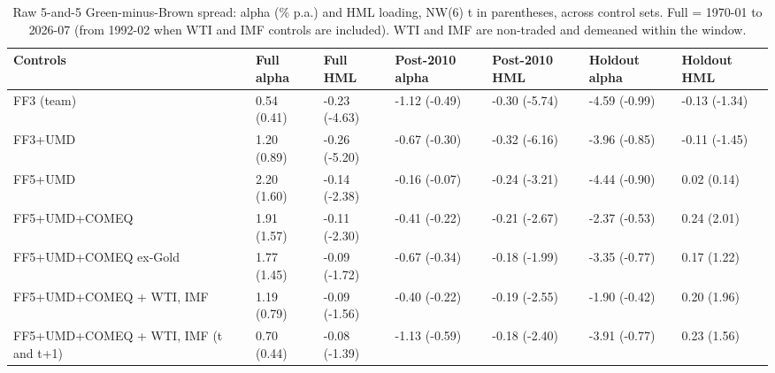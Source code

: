 \begin{table}[H]
\centering\small
\caption{Raw 5-and-5 Green-minus-Brown spread: alpha (\% p.a.) and HML loading, NW(6) t in parentheses, across control sets. Full = 1970-01 to 2026-07 (from 1992-02 when WTI and IMF controls are included). WTI and IMF are non-traded and demeaned within the window.}
\label{tab:m2_spread_controls}
\begin{adjustbox}{max width=\linewidth}
\begin{tabular}{lllllll}
\toprule
Controls & Full alpha & Full HML & Post-2010 alpha & Post-2010 HML & Holdout alpha & Holdout HML \\
\midrule
FF3 (team) & 0.54 (0.41) & -0.23 (-4.63) & -1.12 (-0.49) & -0.30 (-5.74) & -4.59 (-0.99) & -0.13 (-1.34) \\
FF3+UMD & 1.20 (0.89) & -0.26 (-5.20) & -0.67 (-0.30) & -0.32 (-6.16) & -3.96 (-0.85) & -0.11 (-1.45) \\
FF5+UMD & 2.20 (1.60) & -0.14 (-2.38) & -0.16 (-0.07) & -0.24 (-3.21) & -4.44 (-0.90) & 0.02 (0.14) \\
FF5+UMD+COMEQ & 1.91 (1.57) & -0.11 (-2.30) & -0.41 (-0.22) & -0.21 (-2.67) & -2.37 (-0.53) & 0.24 (2.01) \\
FF5+UMD+COMEQ ex-Gold & 1.77 (1.45) & -0.09 (-1.72) & -0.67 (-0.34) & -0.18 (-1.99) & -3.35 (-0.77) & 0.17 (1.22) \\
FF5+UMD+COMEQ + WTI, IMF & 1.19 (0.79) & -0.09 (-1.56) & -0.40 (-0.22) & -0.19 (-2.55) & -1.90 (-0.42) & 0.20 (1.96) \\
FF5+UMD+COMEQ + WTI, IMF (t and t+1) & 0.70 (0.44) & -0.08 (-1.39) & -1.13 (-0.59) & -0.18 (-2.40) & -3.91 (-0.77) & 0.23 (1.56) \\
\bottomrule
\end{tabular}
\end{adjustbox}
\end{table}
